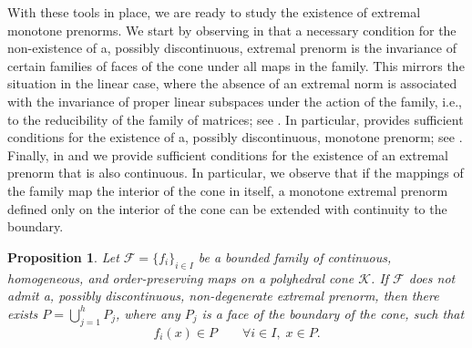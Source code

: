 \documentclass{article}
\newtheorem{proposition}[theorem]{Proposition}
\newcommand{\family}{\mathcal{F}}
\newcommand{\cone}{\mathcal{K}}
\begin{document}
With these tools in place, we are ready to study the existence of extremal monotone prenorms. We start by observing in  that a necessary condition for the non-existence of a, possibly discontinuous, extremal prenorm is the invariance of certain families of faces of the cone under all maps in the family. This mirrors the situation in the linear case, where the absence of an extremal norm is associated with the invariance of proper linear subspaces under the action of the family, i.e., to the reducibility of the family of matrices; see \cite{elsner1995generalized}. In particular,   provides sufficient conditions for the existence of a, possibly discontinuous, monotone prenorm; see . Finally, in  and  we provide sufficient conditions for the existence of an extremal prenorm that is also continuous. In particular, we observe that if the mappings of the family map the interior of the cone in itself, a monotone extremal prenorm defined only on the interior of the cone can be extended with continuity to the boundary.
%
%
\begin{proposition}\label{Proposition_nonlinear_reducibility}
    Let $\family=\{f_i\}_{i\in I}$ be a bounded family of continuous, homogeneous, and order-preserving maps on a polyhedral cone $\cone$. If $\family$ does not admit a, possibly discontinuous, non-degenerate extremal prenorm, then there exists $P=\bigcup_{j=1}^h P_j$, where any $P_j$ is a face of the boundary of the cone, such that 
    \begin{equation}
        f_i(x)\in P \qquad \forall i\in I,\; x\in P.
    \end{equation}
\end{proposition}
%
\end{document}
